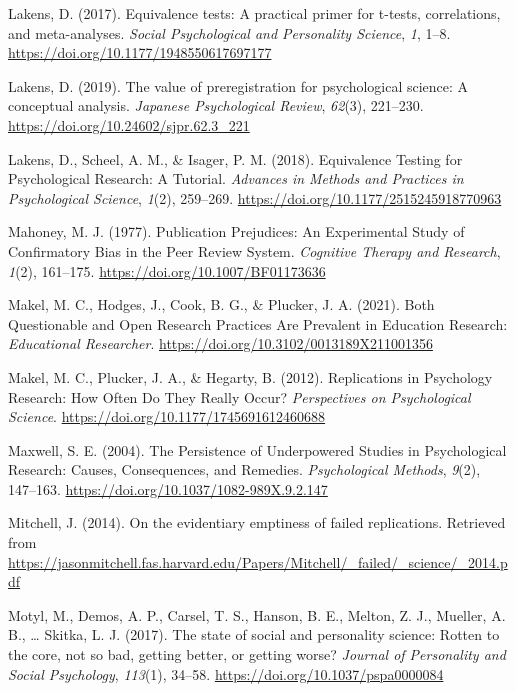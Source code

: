 \documentclass[british,,jou,floatsintext]{apa6}
\begin{document}
\leavevmode\hypertarget{ref-R-TOSTER}{}%
Lakens, D. (2017). Equivalence tests: A practical primer for t-tests, correlations, and meta-analyses. \emph{Social Psychological and Personality Science}, \emph{1}, 1--8. \url{https://doi.org/10.1177/1948550617697177}

\leavevmode\hypertarget{ref-Lakens2019}{}%
Lakens, D. (2019). The value of preregistration for psychological science: A conceptual analysis. \emph{Japanese Psychological Review}, \emph{62}(3), 221--230. \url{https://doi.org/10.24602/sjpr.62.3_221}

\leavevmode\hypertarget{ref-Lakens2018a}{}%
Lakens, D., Scheel, A. M., \& Isager, P. M. (2018). Equivalence Testing for Psychological Research: A Tutorial. \emph{Advances in Methods and Practices in Psychological Science}, \emph{1}(2), 259--269. \url{https://doi.org/10.1177/2515245918770963}

\leavevmode\hypertarget{ref-Mahoney1977}{}%
Mahoney, M. J. (1977). Publication Prejudices: An Experimental Study of Confirmatory Bias in the Peer Review System. \emph{Cognitive Therapy and Research}, \emph{1}(2), 161--175. \url{https://doi.org/10.1007/BF01173636}

\leavevmode\hypertarget{ref-Makel2021}{}%
Makel, M. C., Hodges, J., Cook, B. G., \& Plucker, J. A. (2021). Both Questionable and Open Research Practices Are Prevalent in Education Research: \emph{Educational Researcher}. \url{https://doi.org/10.3102/0013189X211001356}

\leavevmode\hypertarget{ref-Makel2012}{}%
Makel, M. C., Plucker, J. A., \& Hegarty, B. (2012). Replications in Psychology Research: How Often Do They Really Occur? \emph{Perspectives on Psychological Science}. \url{https://doi.org/10.1177/1745691612460688}

\leavevmode\hypertarget{ref-Maxwell2004}{}%
Maxwell, S. E. (2004). The Persistence of Underpowered Studies in Psychological Research: Causes, Consequences, and Remedies. \emph{Psychological Methods}, \emph{9}(2), 147--163. \url{https://doi.org/10.1037/1082-989X.9.2.147}

\leavevmode\hypertarget{ref-Mitchell2014}{}%
Mitchell, J. (2014). On the evidentiary emptiness of failed replications. Retrieved from \url{https://jasonmitchell.fas.harvard.edu/Papers/Mitchell/_failed/_science/_2014.pdf}

\leavevmode\hypertarget{ref-Motyl2017}{}%
Motyl, M., Demos, A. P., Carsel, T. S., Hanson, B. E., Melton, Z. J., Mueller, A. B., \ldots{} Skitka, L. J. (2017). The state of social and personality science: Rotten to the core, not so bad, getting better, or getting worse? \emph{Journal of Personality and Social Psychology}, \emph{113}(1), 34--58. \url{https://doi.org/10.1037/pspa0000084}
\end{document}
